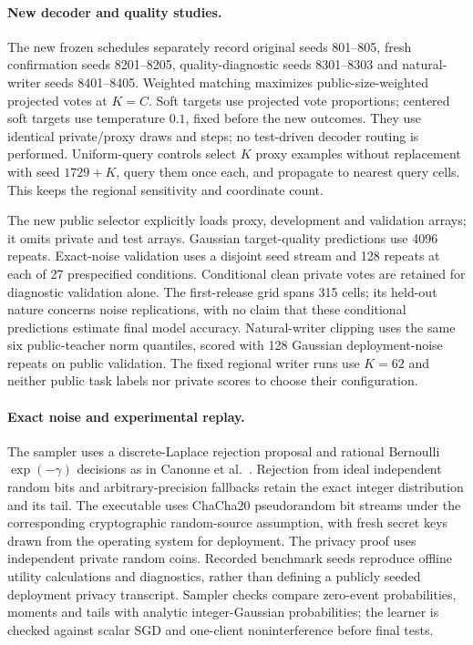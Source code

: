 \paragraph{New decoder and quality studies.}
The new frozen schedules separately record original seeds 801--805, fresh
confirmation seeds 8201--8205, quality-diagnostic seeds 8301--8303 and
natural-writer seeds 8401--8405. Weighted matching maximizes public-size-weighted
projected votes at $K=C$. Soft targets use projected vote proportions;
centered soft targets use temperature $0.1$, fixed before the new outcomes.
They use identical private/proxy draws and steps; no test-driven decoder
routing is performed. Uniform-query controls select $K$ proxy examples without
replacement with seed $1729+K$, query them once each, and propagate to nearest
query cells. This keeps the regional sensitivity and coordinate count.

The new public selector explicitly loads proxy, development and validation
arrays; it omits private and test arrays. Gaussian target-quality predictions
use 4096 repeats. Exact-noise validation uses a disjoint seed stream and 128
repeats at each of 27 prespecified conditions. Conditional clean private votes
are retained for diagnostic validation alone. The first-release grid spans
315 cells; its held-out nature concerns noise replications, with no claim
that these conditional predictions estimate final model accuracy.
Natural-writer clipping uses the same six public-teacher norm quantiles,
scored with 128 Gaussian deployment-noise repeats on public validation.
The fixed regional writer runs use $K=62$ and neither public task labels nor
private scores to choose their configuration.

\paragraph{Exact noise and experimental replay.}
The sampler uses a discrete-Laplace rejection proposal and rational
Bernoulli $\exp(-\gamma)$ decisions as in Canonne et al.~\cite{canonne2020discrete}.
Rejection from ideal independent random bits and arbitrary-precision fallbacks
retain the exact integer distribution and its tail. The executable uses
ChaCha20 pseudorandom bit streams under the corresponding cryptographic
random-source assumption, with fresh secret keys drawn from the operating
system for deployment. The privacy proof uses independent private random coins.
Recorded benchmark seeds reproduce offline utility calculations and diagnostics,
rather than defining a publicly seeded deployment privacy transcript.
Sampler checks compare zero-event probabilities, moments and tails with
analytic integer-Gaussian probabilities; the learner is checked against scalar
SGD and one-client noninterference before final tests.

